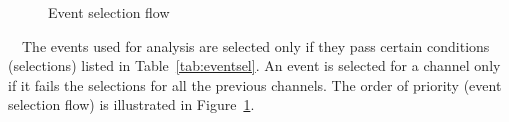 \documentclass[letterpaper,12pt]{article}
\begin{document}
\begin{figure} %
  \scriptsize
  \centering
{}

\caption{Event selection flow}
\label{fig:eventselflow}
\end{figure}
\
\
The events used for analysis are selected only if they pass certain conditions (selections) listed in Table~\ref{tab:eventsel}. An event is selected for a channel only if it fails the selections for all the previous channels. The order of priority (event selection flow) is illustrated in Figure~\ref{fig:eventselflow}.
\end{document}
